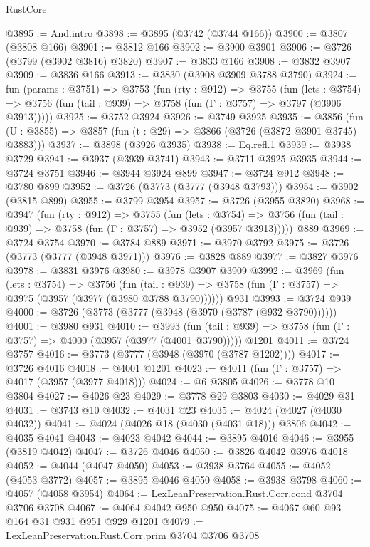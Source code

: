 \begin{lexlean}{RustCore}
\begin{coremodule}
@3895 := And.intro
@3898 := @3895 (@3742 (@3744 @166))
@3900 := @3807 (@3808 @166)
@3901 := @3812 @166
@3902 := @3900 @3901
@3906 := @3726 (@3799 (@3902 @3816) @3820)
@3907 := @3833 @166
@3908 := @3832 @3907
@3909 := @3836 @166
@3913 := @3830 (@3908 @3909 @3788 @3790)
@3924 := fun (params : @3751) =>
  @3753
    (fun (rty : @912) =>
    @3755
      (fun (lets : @3754) =>
      @3756 (fun (tail : @939) => @3758 (fun (Γ : @3757) => @3797 (@3906 @3913)))))
@3925 := @3752 @3924
@3926 := @3749 @3925
@3935 := @3856 (fun (U : @3855) => @3857 (fun (t : @29) => @3866 (@3726 (@3872 @3901 @3745) @3883)))
@3937 := @3898 (@3926 @3935)
@3938 := Eq.refl.{1}
@3939 := @3938 @3729
@3941 := @3937 (@3939 @3741)
@3943 := @3711 @3925 @3935
@3944 := @3724 @3751
@3946 := @3944 @3924 @899
@3947 := @3724 @912
@3948 := @3780 @899
@3952 := @3726 (@3773 (@3777 (@3948 @3793)))
@3954 := @3902 (@3815 @899)
@3955 := @3799 @3954
@3957 := @3726 (@3955 @3820)
@3968 := @3947
    (fun (rty : @912) =>
    @3755
      (fun (lets : @3754) =>
      @3756 (fun (tail : @939) => @3758 (fun (Γ : @3757) => @3952 (@3957 @3913)))))
    @889
@3969 := @3724 @3754
@3970 := @3784 @889
@3971 := @3970 @3792
@3975 := @3726 (@3773 (@3777 (@3948 @3971)))
@3976 := @3828 @889
@3977 := @3827 @3976
@3978 := @3831 @3976
@3980 := @3978 @3907 @3909
@3992 := @3969
    (fun (lets : @3754) =>
    @3756
      (fun (tail : @939) => @3758 (fun (Γ : @3757) => @3975 (@3957 (@3977 (@3980 @3788 @3790))))))
    @931
@3993 := @3724 @939
@4000 := @3726 (@3773 (@3777 (@3948 (@3970 (@3787 (@932 @3790))))))
@4001 := @3980 @931
@4010 := @3993
    (fun (tail : @939) => @3758 (fun (Γ : @3757) => @4000 (@3957 (@3977 (@4001 @3790)))))
    @1201
@4011 := @3724 @3757
@4016 := @3773 (@3777 (@3948 (@3970 (@3787 @1202))))
@4017 := @3726 @4016
@4018 := @4001 @1201
@4023 := @4011 (fun (Γ : @3757) => @4017 (@3957 (@3977 @4018)))
@4024 := @6 @3805
@4026 := @3778 @10 @3804
@4027 := @4026 @23
@4029 := @3778 @29 @3803
@4030 := @4029 @31
@4031 := @3743 @10
@4032 := @4031 @23
@4035 := @4024 (@4027 (@4030 @4032))
@4041 := @4024 (@4026 @18 (@4030 (@4031 @18))) @3806
@4042 := @4035 @4041
@4043 := @4023 @4042
@4044 := @3895 @4016
@4046 := @3955 (@3819 @4042)
@4047 := @3726 @4046
@4050 := @3826 @4042 @3976 @4018
@4052 := @4044 (@4047 @4050)
@4053 := @3938 @3764
@4055 := @4052 (@4053 @3772)
@4057 := @3895 @4046 @4050
@4058 := @3938 @3798
@4060 := @4057 (@4058 @3954)
@4064 := LexLeanPreservation.Rust.Corr.cond @3704 @3706 @3708
@4067 := @4064 @4042 @950 @950
@4075 := @4067 @60 @93 @164 @31 @931 @951 @929 @1201
@4079 := LexLeanPreservation.Rust.Corr.prim @3704 @3706 @3708

\end{coremodule}
\end{lexlean}
